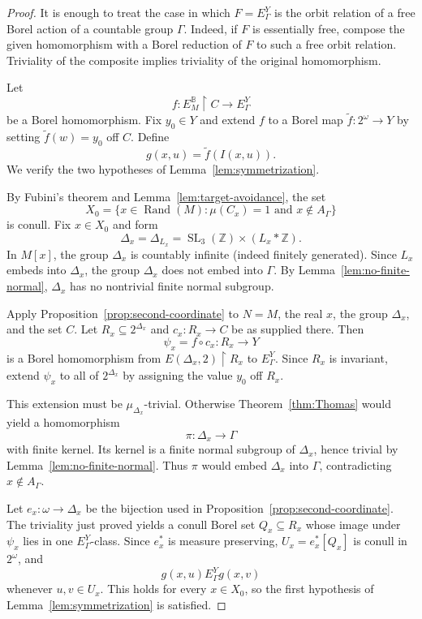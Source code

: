 \documentclass[11pt]{amsart}
\theoremstyle{definition}
\theoremstyle{remark}
\newcommand{\B}{\mathbb B}
\newcommand{\Z}{\mathbb Z}
\newcommand{\SL}{\operatorname{SL}}
\newcommand{\Rand}{\operatorname{Rand}}
\newcommand{\restr}{\mathbin{\upharpoonright}}
\newcommand{\EBM}{E^{\B}_{M}}
\begin{document}
\begin{proof}
It is enough to treat the case in which $F=E^Y_\Gamma$ is the orbit relation of a free Borel action of a countable group $\Gamma$.  Indeed, if $F$ is essentially free, compose the given homomorphism with a Borel reduction of $F$ to such a free orbit relation.  Triviality of the composite implies triviality of the original homomorphism.

Let
\[
 f\colon \EBM\restr C\longrightarrow E^Y_\Gamma
\]
be a Borel homomorphism.  Fix $y_0\in Y$ and extend $f$ to a Borel map $\widetilde f\colon2^\omega\to Y$ by setting $\widetilde f(w)=y_0$ off $C$.  Define
\[
 g(x,u)=\widetilde f(I(x,u)).
\]
We verify the two hypotheses of Lemma~\ref{lem:symmetrization}.

By Fubini's theorem and Lemma~\ref{lem:target-avoidance}, the set
\[
 X_0=
 \{x\in\Rand(M):\mu(C_x)=1\text{ and }x\notin A_\Gamma\}
\]
is conull.  Fix $x\in X_0$ and form
\[
 \Delta_x=\Delta_{L_x}
 =\SL_3(\Z)\times(L_x*\Z).
\]
In $M[x]$, the group $\Delta_x$ is countably infinite (indeed finitely generated).  Since $L_x$ embeds into $\Delta_x$, the group $\Delta_x$ does not embed into $\Gamma$.  By Lemma~\ref{lem:no-finite-normal}, $\Delta_x$ has no nontrivial finite normal subgroup.

Apply Proposition~\ref{prop:second-coordinate} to $N=M$, the real $x$, the group $\Delta_x$, and the set $C$.  Let $R_x\subseteq2^{\Delta_x}$ and $c_x\colon R_x\to C$ be as supplied there.  Then
\[
 \psi_x=f\circ c_x\colon R_x\longrightarrow Y
\]
is a Borel homomorphism from $E(\Delta_x,2)\restr R_x$ to $E^Y_\Gamma$.  Since $R_x$ is invariant, extend $\psi_x$ to all of $2^{\Delta_x}$ by assigning the value $y_0$ off $R_x$.

This extension must be $\mu_{\Delta_x}$-trivial.  Otherwise Theorem~\ref{thm:Thomas} would yield a homomorphism
\[
 \pi\colon\Delta_x\longrightarrow\Gamma
\]
with finite kernel.  Its kernel is a finite normal subgroup of $\Delta_x$, hence trivial by Lemma~\ref{lem:no-finite-normal}.  Thus $\pi$ would embed $\Delta_x$ into $\Gamma$, contradicting $x\notin A_\Gamma$.

Let $e_x\colon\omega\to\Delta_x$ be the bijection used in Proposition~\ref{prop:second-coordinate}.  The triviality just proved yields a conull Borel set $Q_x\subseteq R_x$ whose image under $\psi_x$ lies in one $E^Y_\Gamma$-class.  Since $e_x^*$ is measure preserving, $U_x=e_x^*[Q_x]$ is conull in $2^\omega$, and
\[
 g(x,u)\mathrel{E^Y_\Gamma}g(x,v)
\]
whenever $u,v\in U_x$.  This holds for every $x\in X_0$, so the first hypothesis of Lemma~\ref{lem:symmetrization} is satisfied.


\end{proof}
\end{document}
